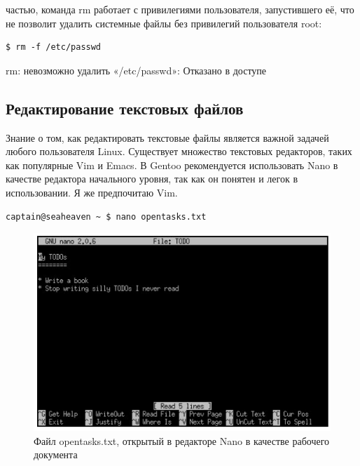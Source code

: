 \documentclass[10pt]{book}
\begin{document}
частью, команда rm работает с привилегиями пользователя, запустившего её, что не позволит удалить системные файлы без привилегий пользователя root:

\vspace{3mm}
\begin{tcolorbox}
\begin{lstlisting}
$ rm -f /etc/passwd
\end{lstlisting}
rm: невозможно удалить «/etc/passwd»: Отказано в доступе
\end{tcolorbox}

\vspace{-4mm}
\subsection{Редактирование текстовых файлов }

Знание о том, как редактировать текстовые файлы является важной задачей любого пользователя Linux. Существует множество текстовых редакторов, таких как популярные Vim и Emacs. В Gentoo рекомендуется использовать Nano  в качестве редактора начального уровня, так как он понятен и легок в использовании. Я же предпочитаю Vim.

\vspace{3mm}
\begin{tcolorbox}
\begin{lstlisting}
captain@seaheaven ~ $ nano opentasks.txt
\end{lstlisting}
\end{tcolorbox}

\begin{figure}[!ht]
\centering
\includegraphics[scale=0.6]{scrn1}
\caption{Файл opentasks.txt, открытый в редакторе Nano в качестве рабочего документа}
\end{figure}
\end{document}
